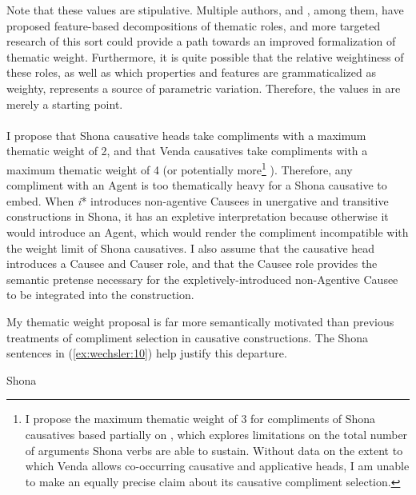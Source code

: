 \documentclass[output=paper]{langscibook}
\begin{document}
Note that these values are stipulative. Multiple authors, \citet{Wunderlich1997} and \citet{Mylne1999}, among them, have proposed feature-based decompositions of thematic roles, and more targeted research of this sort could provide a path towards an improved formalization of thematic weight. Furthermore, it is quite possible that the relative weightiness of these roles, as well as which properties and features are grammaticalized as weighty, represents a source of parametric variation. Therefore, the values in  are merely a starting point.\\
\\
I propose that Shona causative heads take compliments with a maximum thematic weight of 2, and that Venda causatives take compliments with a maximum thematic weight of 4 (or potentially more\footnote{I propose the maximum thematic weight of 3 for compliments of Shona causatives based partially on \citet{Wechsler2014}, which explores limitations on the total number of arguments Shona verbs are able to sustain. Without data on the extent to which Venda allows co-occurring causative and applicative heads, I am unable to make an equally precise claim about its causative compliment selection.} ). Therefore, any compliment with an Agent is too thematically heavy for a Shona causative to embed. When \textit{i}* introduces non-agentive Causees in unergative and transitive constructions in Shona, it has an expletive interpretation because otherwise it would introduce an Agent, which would render the compliment incompatible with the weight limit of Shona causatives. I also assume that the causative head introduces a Causee and Causer role, and that the Causee role provides the semantic pretense necessary for the expletively-introduced non-Agentive Causee to be integrated into the construction. 



My thematic weight proposal is far more semantically motivated than previous treatments of compliment selection in causative constructions. The Shona sentences in (\ref{ex:wechsler:10}) help justify this departure.


\ea\label{ex:wechsler:10}
Shona\\

\tablefirsthead{}
\end{document}
